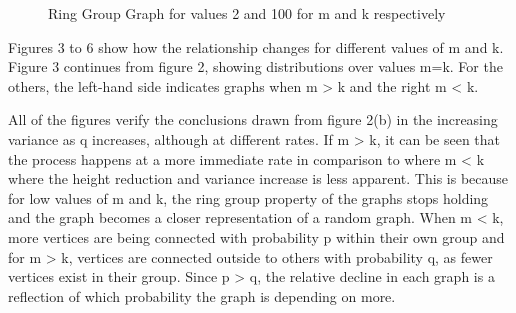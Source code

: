 \documentclass[12pt,a4paper]{article}
\begin{document}
\begin{figure}[]
	\centering
	\qquad
	\caption{Ring Group Graph for values 2 and 100 for m and k respectively}
	\label{both}
\end{figure}

Figures 3 to 6 show how the relationship changes for different values of m and k. Figure 3 continues from figure 2, showing distributions over values m=k. For the others, the left-hand side indicates graphs when m > k and the right m < k.

All of the figures verify the conclusions drawn from figure 2(b) in the increasing variance as q increases, although at different rates. If m > k, it can be seen that the process happens at a more immediate rate in comparison to where m < k where the height reduction and variance increase is less apparent. This is because for low values of m and k, the ring group property of the graphs stops holding and the graph becomes a closer representation of a random graph. When m < k, more vertices are being connected with probability p within their own group and for m > k, vertices are connected outside to others with probability q, as fewer vertices exist in their group. Since p > q, the relative decline in each graph is a reflection of which probability the graph is depending on more.  
\end{document}
